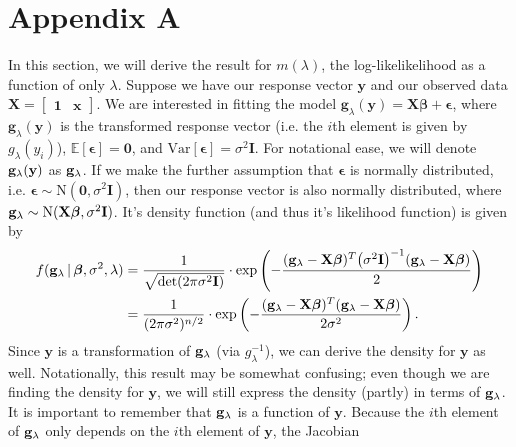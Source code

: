 \documentclass[10pt]{article}
\begin{document}
\section{Appendix A} \noindent

In this section, we will derive the result for \(m(\lambda)\), the log-likelikelihood as a function of only \(\lambda\).
Suppose we have our response vector \(\mathbf{y}\) and our observed data \(\mathbf{X} = \begin{bmatrix}
    \mathbf{1} & \mathbf{x}
\end{bmatrix}\). 
We are interested in fitting the model \(\mathbf{g}_{\lambda}(\mathbf{y}) = \mathbf{X}\bm{\beta} + \bm{\epsilon}\), where \(\mathbf{g}_{\lambda}(\mathbf{y})\)
is the transformed response vector (i.e. the \(i\)th element is given by \(g_{\lambda}(y_i)\)), \(\mathbb{E}[\bm{\epsilon}] = \mathbf{0}\), and 
\(\mathrm{Var}[\bm{\epsilon}] = \sigma^2 \mathbf{I}\). 
For notational ease, we will denote \(\mathbf{g}_{\lambda}(\mathbf{y})\) as \(\mathbf{g}_{\lambda}\). 
If we make the further assumption that \(\bm{\epsilon}\) is normally distributed, i.e. 
\(\bm{\epsilon} \sim \mathrm{N}(\mathbf{0}, \sigma^2 \mathbf{I})\), then our response vector is also normally distributed, where
\(\mathbf{g}_{\lambda} \sim \mathrm{N}(\mathbf{X}\bm{\beta}, \sigma^2 \mathbf{I})\). It's density function (and thus it's likelihood function) is given by 
\begin{align*}
    f(\mathbf{g}_{\lambda} \,|\, \bm{\beta}, \sigma^2, \lambda)
    &= \frac{1}{\sqrt{\mathrm{det}(2 \pi \sigma^2 \mathbf{I})}} \cdot \mathrm{exp} \left( - \frac{(\mathbf{g}_{\lambda} - \mathbf{X}\bm{\beta})^T \big( \sigma^2 \mathbf{I} \big)^{-1} (\mathbf{g}_{\lambda} - \mathbf{X}\bm{\beta})}{2} \right) \\
    &= \frac{1}{(2\pi\sigma^2)^{n/2}} \cdot \mathrm{exp} \left( - \frac{(\mathbf{g}_{\lambda} - \mathbf{X}\bm{\beta})^T (\mathbf{g}_{\lambda} - \mathbf{X}\bm{\beta})}{2 \sigma^2} \right).
\end{align*}
Since \(\mathbf{y}\) is a transformation of \(\mathbf{g}_{\lambda}\) (via \(g_{\lambda}^{-1}\)), we can derive the density for \(\mathbf{y}\) as well. Notationally, this result may be somewhat 
confusing; even though we are finding the density for \(\mathbf{y}\), we will still express the density (partly) in terms of \(\mathbf{g}_{\lambda}\). It is important
to remember that \(\mathbf{g}_{\lambda}\) is a function of \(\mathbf{y}\). Because the \(i\)th element of \(\mathbf{g}_{\lambda}\) only depends on the \(i\)th element of \(\mathbf{y}\), the Jacobian
\end{document}
